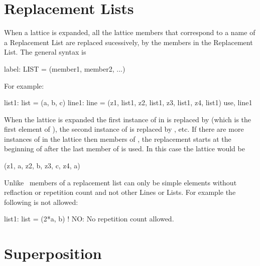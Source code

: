 \section{Replacement Lists}

When a lattice is expanded, all the lattice members that correspond to a name of a Replacement List 
are replaced sucessively, by the members
in the Replacement List. The general syntax is
\begin{example}
  label: LIST = (member1, member2, ...)
\end{example}
For example:
\begin{example}
  list1: list = (a, b, c)
  line1: line = (z1, list1, z2, list1, z3, list1, z4, list1)
  use, line1
\end{example}
When the lattice is expanded the first instance of  in  is replaced by  
(which is the first element of ), the second instance of  is replaced by ,
etc. If there are more instances of  in the lattice then members of ,
the replacement starts at the beginning of  after the last member of  is used.
In this case the lattice would be
\begin{example}
  (z1, a, z2, b, z3, c, z4, a)
\end{example}
Unlike \mad\, members of a replacement list can only be simple elements without reflaction or repetition count and not other Lines or Lists. For example the following is not allowed:
\begin{example}
  list1: list = (2*a, b)  ! NO: No repetition count allowed.
\end{example}

\section{Superposition}

